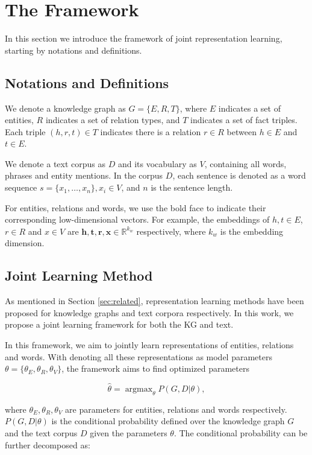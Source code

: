\documentclass[11pt,a4paper]{article}
\begin{document}
\section{The Framework}
In this section we introduce the framework of joint representation learning, starting by notations and definitions.

\subsection{Notations and Definitions}

We denote a knowledge graph as $G = \{E, R, T\}$, where $E$ indicates a set of entities, $R$ indicates a set of relation types, and $T$ indicates a set of fact triples. Each triple $(h, r, t) \in T$ indicates there is a relation $r \in R$ between $h \in E$ and $t \in E$.

We denote a text corpus as $D$ and its vocabulary as $V$, containing all words, phrases and entity mentions. In the corpus $D$, each sentence is denoted as a word sequence $s = \{x_1, \ldots, x_n\}, x_i \in V$, and $n$ is the sentence length.

For entities, relations and words, we use the bold face to indicate their corresponding low-dimensional vectors. For example, the embeddings of $h, t \in E$, $r \in R$ and $x \in V$ are $\mathbf{h}, \mathbf{t}, \mathbf{r}, \mathbf{x} \in \mathbb{R}^{k_w}$ respectively, where $k_w$ is the embedding dimension.


\subsection{Joint Learning Method}
As mentioned in Section \ref{sec:related}, representation learning methods have been proposed for knowledge graphs and text corpora respectively. In this work, we propose a joint learning framework for both the KG and text.

In this framework, we aim to jointly learn representations of entities, relations and words. With denoting all these representations as model parameters $\theta = \{\theta_E, \theta_R, \theta_V\}$, the framework aims to find optimized parameters

\begin{equation}
\hat{\theta} = \mathop{\arg\max}_{\theta} P(G, D | {\theta}),
\end{equation}

where $\theta_E, \theta_R, \theta_V$ are parameters for entities, relations and words respectively. $P(G, D | {\theta})$ is the conditional probability defined over the knowledge graph $G$ and the text corpus $D$ given the parameters $\theta$. The conditional probability can be further decomposed as:
\end{document}
